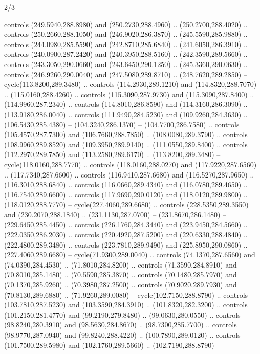 \begin{flagdescription}{2/3}
\begin{scope}[xshift=0.5\flaglength,yshift=0.5\flagwidth,scale=\stretchfactor]
\begin{scope}[scale=0.001645\flagwidth,yshift=65mm,xshift=-63mm]
\begin{scope}[y=0.80pt, x=0.80pt, yscale=-1,]
\begin{scope}[cm={{1.33333,0.0,0.0,1.33333,(0.0,1e-05)}}]
  controls (249.5940,288.8980) and (250.2730,288.4960) .. (250.2700,288.4020) ..
  controls (250.2660,288.1050) and (246.9020,286.3870) .. (245.5590,285.9880) ..
  controls (244.0980,285.5590) and (242.8710,285.6840) .. (241.6050,286.3910) ..
  controls (240.0900,287.2420) and (240.3950,288.5160) .. (242.3590,289.5660) ..
  controls (243.3050,290.0660) and (243.6450,290.1250) .. (245.3360,290.0630) ..
  controls (246.9260,290.0040) and (247.5080,289.8710) .. (248.7620,289.2850) --
  cycle(113.8200,289.3480) .. controls (114.2930,289.1210) and
  (114.8320,288.7070) .. (115.0160,288.4260) .. controls (115.3090,287.9730) and
  (115.3090,287.8400) .. (114.9960,287.2340) .. controls (114.8010,286.8590) and
  (114.3160,286.3090) .. (113.9180,286.0040) .. controls (111.9490,284.5230) and
  (109.9260,284.3630) .. (106.5430,285.4380) -- (104.3240,286.1370) --
  (104.7700,286.7580) .. controls (105.4570,287.7300) and (106.7660,288.7850) ..
  (108.0080,289.3790) .. controls (108.9960,289.8520) and (109.3950,289.9140) ..
  (111.0550,289.8400) .. controls (112.2970,289.7850) and (113.2580,289.6170) ..
  (113.8200,289.3480) -- cycle(118.0160,288.7770) .. controls
  (118.0160,288.0270) and (117.9220,287.6560) .. (117.7340,287.6600) .. controls
  (116.9410,287.6680) and (116.5270,287.9650) .. (116.3010,288.6840) .. controls
  (116.0660,289.4340) and (116.0780,289.4650) .. (116.7540,289.6600) .. controls
  (117.9690,290.0120) and (118.0120,289.9800) .. (118.0120,288.7770) --
  cycle(227.4060,289.6680) .. controls (228.5350,289.3550) and
  (230.2070,288.1840) .. (231.1130,287.0700) -- (231.8670,286.1480) --
  (229.6450,285.4450) .. controls (226.1760,284.3440) and (223.9450,284.5660) ..
  (222.0350,286.2030) .. controls (220.4920,287.5200) and (220.6330,288.4840) ..
  (222.4800,289.3480) .. controls (223.7810,289.9490) and (225.8950,290.0860) ..
  (227.4060,289.6680) -- cycle(71.9300,289.0040) .. controls (74.1370,287.6560)
  and (74.0390,284.4530) .. (71.8010,284.8200) .. controls (71.3590,284.8910)
  and (70.8010,285.1480) .. (70.5590,285.3870) .. controls (70.1480,285.7970)
  and (70.1370,285.9260) .. (70.3980,287.2500) .. controls (70.9020,289.7930)
  and (70.8130,289.6880) .. (71.9260,289.0080) -- cycle(102.7150,288.8790) ..
  controls (103.7810,287.5230) and (103.3590,284.3910) .. (101.8320,282.3200) ..
  controls (101.2150,281.4770) and (99.2190,279.8480) .. (99.0630,280.0550) ..
  controls (98.8240,280.3910) and (98.5630,284.8670) .. (98.7300,285.7700) ..
  controls (98.9770,287.0940) and (99.8240,288.4220) .. (100.7890,289.0120) ..
  controls (101.7500,289.5980) and (102.1760,289.5660) .. (102.7190,288.8790) --

\end{scope}
\end{scope}
\end{scope}
\end{scope}
\end{flagdescription}
